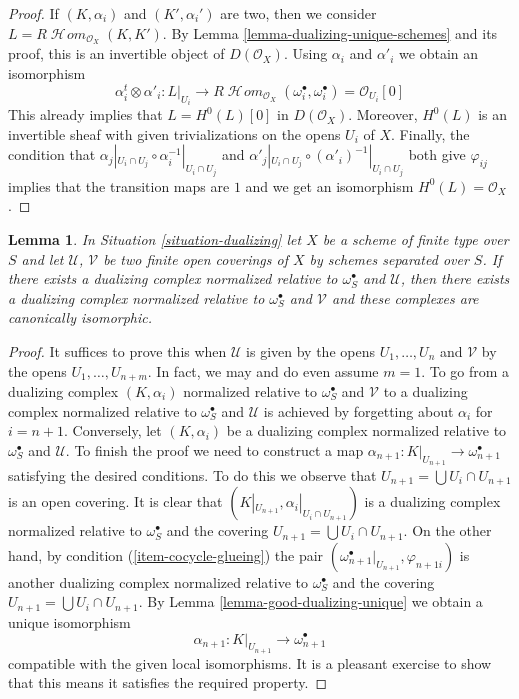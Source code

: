 \documentclass{stacks-project}
\theoremstyle{plain}
\newtheorem{lemma}[subsection]{Lemma}
\theoremstyle{definition}
\theoremstyle{remark}
\numberwithin{equation}{subsection}
\def\SheafHom{\mathop{\mathcal{H}\!\mathit{om}}\nolimits}
\begin{document}
\begin{proof}
If $(K, \alpha_i)$ and $(K', \alpha_i')$ are two, then we consider
$L = R\SheafHom_{\mathcal{O}_X}(K, K')$.
By Lemma \ref{lemma-dualizing-unique-schemes}
and its proof, this is an invertible object of $D(\mathcal{O}_X)$.
Using $\alpha_i$ and $\alpha'_i$ we obtain an isomorphism
$$
\alpha_i^t \otimes \alpha'_i :
L|_{U_i} \longrightarrow
R\SheafHom_{\mathcal{O}_X}(\omega_i^\bullet, \omega_i^\bullet) =
\mathcal{O}_{U_i}[0]
$$
This already implies that $L = H^0(L)[0]$ in $D(\mathcal{O}_X)$.
Moreover, $H^0(L)$ is an invertible sheaf with given trivializations
on the opens $U_i$ of $X$. Finally, the condition that
$\alpha_j|_{U_i \cap U_j} \circ \alpha_i^{-1}|_{U_i \cap U_j}$
and
$\alpha'_j|_{U_i \cap U_j} \circ (\alpha'_i)^{-1}|_{U_i \cap U_j}$
both give $\varphi_{ij}$ implies that the transition maps
are $1$ and we get an isomorphism $H^0(L) = \mathcal{O}_X$.
\end{proof}

\begin{lemma}
\label{lemma-good-dualizing-independence-covering}
In Situation \ref{situation-dualizing} let $X$ be a scheme of finite type
over $S$ and let $\mathcal{U}$, $\mathcal{V}$ be two finite open coverings
of $X$ by schemes separated over $S$.
If there exists a dualizing complex normalized
relative to $\omega_S^\bullet$ and $\mathcal{U}$, then
there exists a dualizing complex normalized relative to
$\omega_S^\bullet$ and $\mathcal{V}$ and these complexes are
canonically isomorphic.
\end{lemma}

\begin{proof}
It suffices to prove this when $\mathcal{U}$ is given by the opens
$U_1, \ldots, U_n$ and $\mathcal{V}$ by the opens $U_1, \ldots, U_{n + m}$.
In fact, we may and do even assume $m = 1$.
To go from a dualizing complex $(K, \alpha_i)$ normalized
relative to $\omega_S^\bullet$ and $\mathcal{V}$ to a
dualizing complex normalized relative to $\omega_S^\bullet$ and $\mathcal{U}$
is achieved by forgetting about $\alpha_i$ for $i = n + 1$. Conversely, let
$(K, \alpha_i)$ be a dualizing complex normalized relative to
$\omega_S^\bullet$ and $\mathcal{U}$.
To finish the proof we need to construct a map
$\alpha_{n + 1} : K|_{U_{n + 1}} \to \omega_{n + 1}^\bullet$ satisfying
the desired conditions.
To do this we observe that $U_{n + 1} = \bigcup U_i \cap U_{n + 1}$
is an open covering.
It is clear that $(K|_{U_{n + 1}}, \alpha_i|_{U_i \cap U_{n + 1}})$
is a dualizing complex normalized relative to $\omega_S^\bullet$
and the covering $U_{n + 1} = \bigcup U_i \cap U_{n + 1}$.
On the other hand, by condition (\ref{item-cocycle-glueing}) the pair
$(\omega_{n + 1}^\bullet|_{U_{n + 1}}, \varphi_{n + 1i})$
is another dualizing complex normalized relative to $\omega_S^\bullet$
and the covering
$U_{n + 1} = \bigcup U_i \cap U_{n + 1}$.
By Lemma \ref{lemma-good-dualizing-unique} we obtain a unique isomorphism
$$
\alpha_{n + 1} : K|_{U_{n + 1}} \longrightarrow \omega_{n + 1}^\bullet
$$
compatible with the given local isomorphisms.
It is a pleasant exercise to show that this means it satisfies
the required property.
\end{proof}
\end{document}
